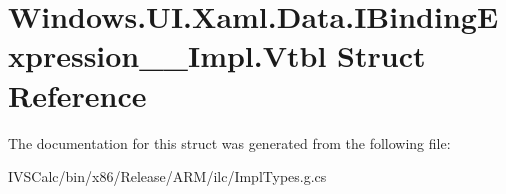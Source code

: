 \hypertarget{struct_windows_1_1_u_i_1_1_xaml_1_1_data_1_1_i_binding_expression_____impl_1_1_vtbl}{}\section{Windows.\+U\+I.\+Xaml.\+Data.\+I\+Binding\+Expression\+\_\+\+\_\+\+Impl.\+Vtbl Struct Reference}
\label{struct_windows_1_1_u_i_1_1_xaml_1_1_data_1_1_i_binding_expression_____impl_1_1_vtbl}


The documentation for this struct was generated from the following file\+:\begin{DoxyCompactItemize}
\item 
I\+V\+S\+Calc/bin/x86/\+Release/\+A\+R\+M/ilc/Impl\+Types.\+g.\+cs\end{DoxyCompactItemize}
